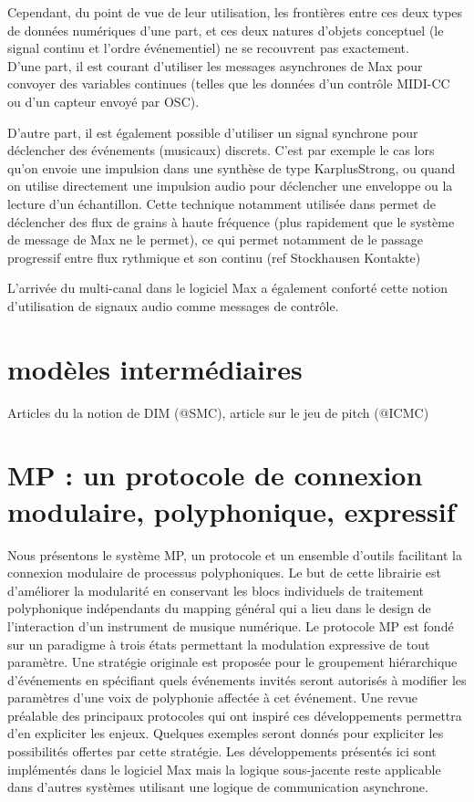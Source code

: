 Cependant, du point de vue de leur utilisation, les frontières entre ces deux types de données numériques d'une part, et ces deux natures d'objets conceptuel (le signal continu et l'ordre événementiel) ne se recouvrent pas exactement. \\
D'une part, il est courant d'utiliser les messages asynchrones de Max pour convoyer des variables continues (telles que les données d'un contrôle MIDI-CC ou d'un capteur envoyé par OSC).\\


D'autre part, il est également possible d'utiliser un signal synchrone pour déclencher des événements (musicaux) discrets. C'est par exemple le cas lors qu'on envoie une impulsion dans une synthèse de type \gls{KarplusStrong}, ou quand on utilise directement une impulsion audio pour déclencher une enveloppe ou la lecture d'un échantillon.
Cette technique notamment utilisée dans \cite{bascou_gmu_2005} permet de déclencher des flux de grains à haute fréquence (plus rapidement que le système de message de Max ne le permet), ce qui permet notamment de le passage progressif entre flux rythmique et son continu (ref Stockhausen Kontakte)


L'arrivée du multi-canal dans le logiciel Max a également conforté cette notion d'utilisation de signaux audio comme messages de contrôle.


\section{modèles intermédiaires}
\label{sec:algorithms:MID}
Articles du la notion de DIM (@SMC), article sur le jeu de pitch (@ICMC)

\section{MP : un protocole de connexion modulaire, polyphonique, expressif}
\label{sec:algorithms:MP}

Nous présentons le système MP, un protocole et un ensemble d'outils facilitant la connexion modulaire de processus polyphoniques. Le but de cette librairie est d'améliorer la modularité en conservant les blocs individuels de traitement polyphonique indépendants du mapping général qui a lieu dans le design de l'interaction d'un instrument de musique numérique. Le protocole MP est fondé sur un paradigme à trois états permettant la modulation expressive de tout paramètre. Une stratégie originale est proposée pour le groupement hiérarchique d'événements en spécifiant quels événements invités seront autorisés à modifier les paramètres d'une voix de polyphonie affectée à cet événement. Une revue préalable des principaux protocoles qui ont inspiré ces développements permettra d'en expliciter les enjeux. Quelques exemples seront donnés pour expliciter les possibilités offertes par cette stratégie. Les développements présentés ici sont implémentés dans le logiciel Max mais la logique sous-jacente reste applicable dans d'autres systèmes utilisant une logique de communication asynchrone.

